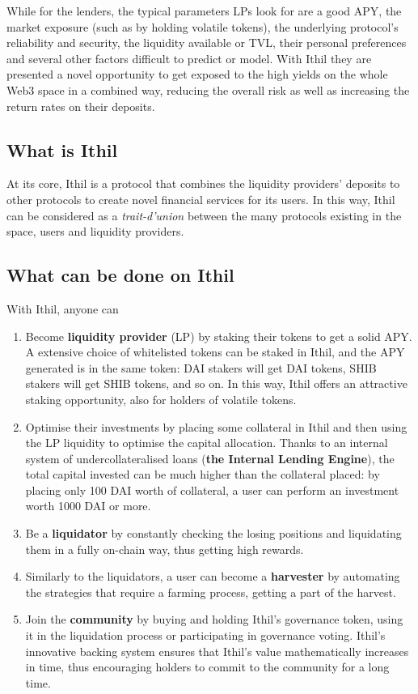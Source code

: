 \documentclass[a4paper,10 pt]{article}
\theoremstyle{definition}
\begin{document}
While for the lenders, the typical parameters LPs look for are a good APY, the market exposure (such as by holding volatile tokens), the underlying protocol's reliability and security, the liquidity available or TVL, their personal preferences and several other factors difficult to predict or model.
With Ithil they are presented a novel opportunity to get exposed to the high yields on the whole Web3 space in a combined way, reducing the overall risk as well as increasing the return rates on their deposits.

\subsection{What is Ithil}
At its core, Ithil is a protocol that combines the liquidity providers' deposits to other protocols to create novel financial services for its users. In this way, Ithil can be considered as a {\it trait-d'union} between the many protocols existing in the space, users and liquidity providers.

\subsection{What can be done on Ithil}
With Ithil, anyone can
\begin{enumerate}
\item Become {\bf liquidity provider} (LP) by staking their tokens to get a solid APY. A extensive choice of whitelisted tokens can be staked in Ithil, and the APY generated is in the same token: DAI stakers will get DAI tokens, SHIB stakers will get SHIB tokens, and so on. In this way, Ithil offers an attractive staking opportunity, also for holders of volatile tokens.
\item Optimise their investments by placing some collateral in Ithil and then using the LP liquidity to optimise the capital allocation. Thanks to an internal system of undercollateralised loans ({\bf the Internal Lending Engine}), the total capital invested can be much higher than the collateral placed: by placing only 100 DAI worth of collateral, a user can perform an investment worth 1000 DAI or more.
\item Be a {\bf liquidator} by constantly checking the losing positions and liquidating them in a fully on-chain way, thus getting high rewards.
\item Similarly to the liquidators, a user can become a {\bf harvester} by automating the strategies that require a farming process, getting a part of the harvest.
\item Join the {\bf community} by buying and holding Ithil's governance token, using it in the liquidation process or participating in governance voting. Ithil's innovative backing system ensures that Ithil's value mathematically increases in time, thus encouraging holders to commit to the community for a long time.
\end{enumerate}
\end{document}
